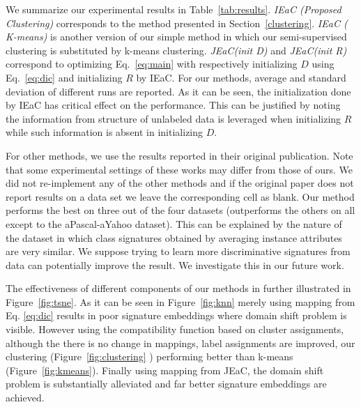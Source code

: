 \documentclass[letterpaper]{article}
\begin{document}
We summarize our experimental results in Table~\ref{tab:results}.
\textit{IEaC (Proposed Clustering)} corresponds to the method presented in Section~\ref{clustering}.
\textit{IEaC ( K-means)} is another version of our simple  method in which our semi-supervised clustering is substituted by k-means clustering.
\textit{JEaC(init D)} and \textit{JEaC(init R)} correspond to optimizing Eq.~\eqref{eq:main}
with respectively initializing $D$ using Eq.~\eqref{eq:dic} and initializing $R$ by IEaC.
For our methods, average and standard deviation of different runs are reported. As it can be seen, the initialization done
by IEaC has critical effect on the performance. This can be justified by noting the information from structure of
unlabeled data is leveraged when initializing $R$ while such information is absent in initializing $D$.

 For other methods, we use the results reported in their original publication. Note that some experimental settings of these works may differ from those of ours. We did not re-implement any of the other methods and if the original paper does not report results on a data set we leave the corresponding cell as blank.
Our method performs the best on three out of the four datasets (outperforms the others on all except to the aPascal-aYahoo dataset). This can be explained by the nature of the dataset in which class signatures obtained by averaging instance attributes are very similar. We suppose trying to learn
more discriminative signatures from data can potentially improve the result. We investigate this in our future work.

The effectiveness of different components of our methods in further illustrated in Figure~\ref{fig:tsne}. As it can be seen in
Figure~\ref{fig:knn} merely using mapping from Eq. \eqref{eq:dic} results in poor signature embeddings where domain shift problem is
visible. However using the compatibility function based on cluster assignments, although the there is no change in mappings,
label assignments are improved, our clustering  (Figure~\ref{fig:clustering} ) performing  better than k-means (Figure~\ref{fig:kmeans}). Finally using
mapping from JEaC, the domain shift problem is substantially alleviated and far better signature embeddings are achieved.
%
%
%
%
\end{document}
